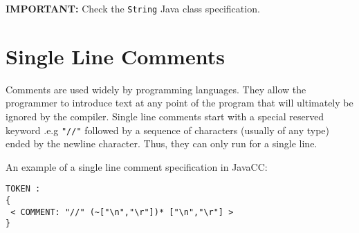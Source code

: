 \documentclass{article}
\begin{document}
\textbf{IMPORTANT:} Check the {\tt String} Java class specification.

\section{Single Line Comments}
Comments are used widely by programming languages. They allow the programmer to introduce text at any point of the program that will ultimately be ignored by the compiler. Single line comments start with a special reserved keyword .e.g \verb+"//"+ followed by a sequence of characters  (usually of any type)  ended by the newline character. Thus, they can only run for a single line.

An example of a single line comment specification in JavaCC:

\begin{verbatim}
TOKEN :
{
 < COMMENT: "//" (~["\n","\r"])* ["\n","\r"] >
}
\end{verbatim}
\end{document}
